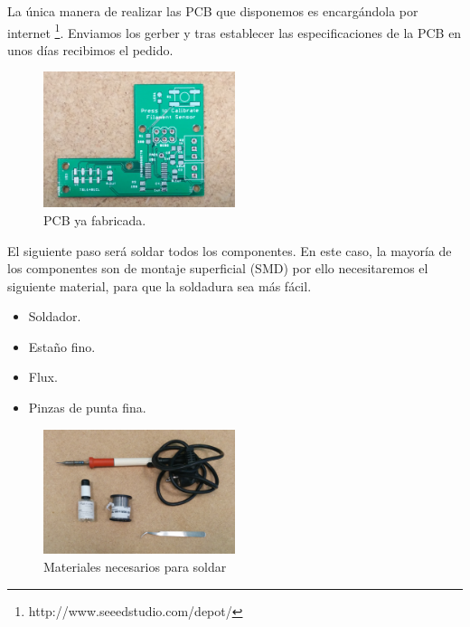 La única manera de realizar las PCB que disponemos es encargándola por internet \footnote{http://www.seeedstudio.com/depot/}. Enviamos los gerber y tras establecer las especificaciones de la PCB en unos días recibimos el pedido.\\
\begin{figure}[H]
    \centering
    \includegraphics[width=0.5\textwidth]{images/sensor/IMG_20150414_105219_.jpg}
    \caption{PCB ya fabricada.}
    \label{fig:sens_pcb}
\end{figure}

El siguiente paso será soldar todos los componentes. En este caso, la mayoría de los componentes son de montaje superficial (SMD) por ello necesitaremos el siguiente material, para que la soldadura sea más fácil.

\begin{itemize}
	\item{Soldador.}
	\item{Estaño fino.}
	\item{Flux.}
	\item{Pinzas de punta fina.}
\end{itemize}

\begin{figure}[H]
    \centering
    \includegraphics[width=0.5\textwidth]{images/sensor/IMG_20150417_160216.jpg}
    \caption{Materiales necesarios para soldar}
    \label{fig:sens_materiales}
\end{figure}

